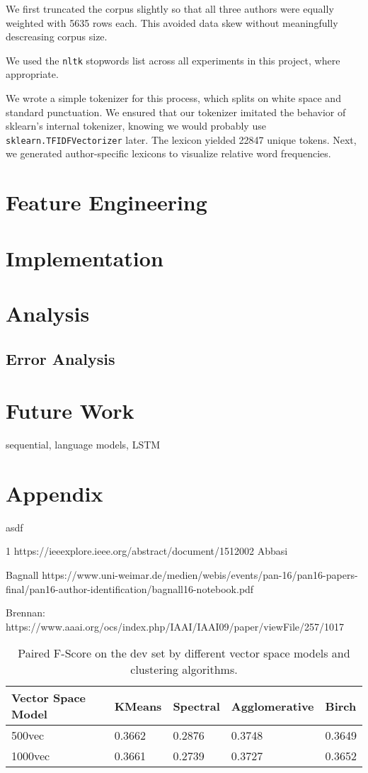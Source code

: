 \documentclass[12pt]{article}
\begin{document}
We first truncated the corpus slightly so that all three authors were equally weighted with 5635 rows each. This avoided data skew without meaningfully descreasing corpus size. 

We used the \texttt{nltk} stopwords list across all experiments in this project, where appropriate.

We wrote a simple tokenizer for this process, which splits on white space and standard punctuation. We ensured that our tokenizer imitated the behavior of sklearn's internal tokenizer, knowing we would probably use \texttt{sklearn.TFIDFVectorizer} later. The lexicon yielded 22847 unique tokens. Next, we generated author-specific lexicons to visualize relative word frequencies.


\section{Feature Engineering}

\section{Implementation}

\section{Analysis}
\subsection{Error Analysis}

\section{Future Work}
sequential, language models, LSTM

\section{Appendix}

asdf

1 https://ieeexplore.ieee.org/abstract/document/1512002 Abbasi

Bagnall https://www.uni-weimar.de/medien/webis/events/pan-16/pan16-papers-final/pan16-author-identification/bagnall16-notebook.pdf

Brennan: https://www.aaai.org/ocs/index.php/IAAI/IAAI09/paper/viewFile/257/1017

\begin{table}[]
\centering
\begin{tabular}{l|l|l|l|l}
Vector Space Model	& KMeans	& Spectral		& Agglomerative	& Birch \\
\hline
500vec			& 0.3662	& 0.2876		& 0.3748			& 0.3649 \\
1000vec			& 0.3661	& 0.2739		& 0.3727			& 0.3652 \\        
\end{tabular}
\caption{Paired F-Score on the dev set by different vector space models and clustering algorithms.}
\label{tab:sparseresults}
\end{table}
\end{document}
